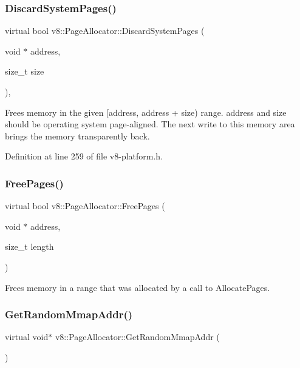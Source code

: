 \subsubsection{\texorpdfstring{Discard\+System\+Pages()}{DiscardSystemPages()}}
{\footnotesize\ttfamily virtual bool v8\+::\+Page\+Allocator\+::\+Discard\+System\+Pages (\begin{DoxyParamCaption}\item[{void $\ast$}]{address,  }\item[{size\+\_\+t}]{size }\end{DoxyParamCaption})\hspace{0.3cm}{\ttfamily [inline]}, {\ttfamily [virtual]}}

Frees memory in the given \mbox{[}address, address + size) range. address and size should be operating system page-\/aligned. The next write to this memory area brings the memory transparently back. 

Definition at line 259 of file v8-\/platform.\+h.

\mbox{\label{classv8_1_1PageAllocator_abc2e3fdc768aba7d35ce0cf44f14586c}} 
\subsubsection{\texorpdfstring{Free\+Pages()}{FreePages()}}
{\footnotesize\ttfamily virtual bool v8\+::\+Page\+Allocator\+::\+Free\+Pages (\begin{DoxyParamCaption}\item[{void $\ast$}]{address,  }\item[{size\+\_\+t}]{length }\end{DoxyParamCaption})\hspace{0.3cm}{\ttfamily [pure virtual]}}

Frees memory in a range that was allocated by a call to Allocate\+Pages. \mbox{\label{classv8_1_1PageAllocator_a37f194f9c5fdbe5105476cbd1432418c}} 
\subsubsection{\texorpdfstring{Get\+Random\+Mmap\+Addr()}{GetRandomMmapAddr()}}
{\footnotesize\ttfamily virtual void$\ast$ v8\+::\+Page\+Allocator\+::\+Get\+Random\+Mmap\+Addr (\begin{DoxyParamCaption}{ }\end{DoxyParamCaption})\hspace{0.3cm}{\ttfamily [pure virtual]}}

